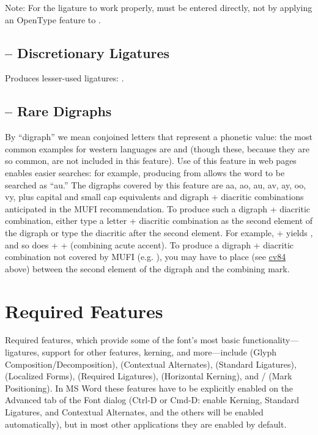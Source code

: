 \noindent{}
Note: For the ligature  to
work properly,   must be entered directly, not by applying an OpenType feature to
.

\subsection{ --
Discretionary Ligatures}
Produces lesser-used ligatures:
.

\subsection{ -- Rare
Digraphs}\hypertarget{ss17}{}
By ``digraph'' we mean conjoined letters that represent a phonetic value: the most common examples
for western languages are \textex{{\ae}} and \textex{{\oe}} (though these, because they
are so common, are not included in this feature). Use of this feature in web pages enables easier searches: for
example, producing  from
 allows the word to be
searched as ``{\th}au.'' The digraphs covered by this feature are \textcolor[rgb]{0.5529412,0.15686275,0.11764706}{%
aa, ao, au, av, ay, oo, vy,} plus capital and small cap equivalents and digraph + diacritic combinations anticipated in the
MUFI recommendation. To produce such a digraph + diacritic combination, either type a letter + diacritic combination as
the second element of the digraph or type the diacritic after the second element. For example,
 +  yields , and so does
 +  +  (combining acute accent). To produce a digraph +
diacritic combination not covered by MUFI (e.g. ), you may have to place 
 (see \hyperlink{cv84}{cv84} above) between the second element of the digraph and the combining mark.

\section{Required Features}
Required features, which provide some of the font’s most basic functionality---ligatures, support for
other features, kerning, and more---include  (Glyph Composition/Decomposition),
 (Contextual Alternates),  (Standard Ligatures),
 (Localized Forms),  (Required Ligatures),
 (Horizontal Kerning), and / (Mark
Positioning). In MS Word these features have to be explicitly enabled on the Advanced tab of the Font dialog (Ctrl-D or
Cmd-D: enable Kerning, Standard Ligatures, and Contextual Alternates, and the others will be enabled automatically),
but in most other applications they are enabled by default.


